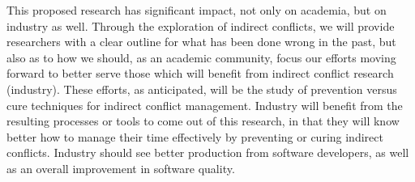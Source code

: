 \documentclass[conference]{IEEEtran}
\begin{document}
This proposed research has significant impact, not only on academia, but on industry as well. Through the exploration of indirect conflicts,
we will provide researchers with a clear outline for what has been done wrong in the past, but also as to how we should, as an academic
community, focus our efforts moving forward to better serve those which will benefit from indirect conflict research (industry). These
efforts, as anticipated, will be the study of prevention versus cure techniques for indirect conflict management. Industry
will benefit from the resulting processes or tools to come out of this research, in that they will know better how to manage their time effectively
by preventing or curing indirect conflicts. Industry should see better production from software developers, as well as an overall improvement
in software quality. 





\end{document}
